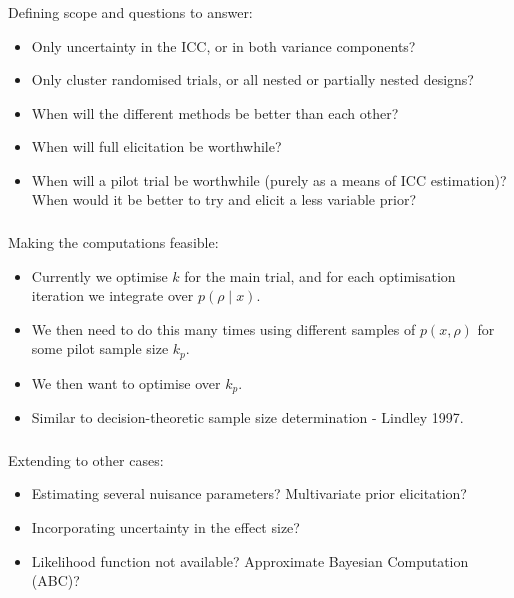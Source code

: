 \documentclass{beamer}
\begin{document}
\begin{frame}
\frametitle{}
Defining scope and questions to answer:
\begin{itemize}
\item Only uncertainty in the ICC, or in both variance components?
\item Only cluster randomised trials, or all nested or partially nested designs?
\item When will the different methods be better than each other?
\item When will full elicitation be worthwhile?
\item When will a pilot trial be worthwhile (purely as a means of ICC estimation)? When would it be better to try and elicit a less variable prior?
\end{itemize}
\end{frame}

\begin{frame}
\frametitle{}
Making the computations feasible:
\begin{itemize}
\item Currently we optimise $k$ for the main trial, and for each optimisation iteration we integrate over $p(\rho \mid x)$.
\item We then need to do this many times using different samples of $p(x, \rho)$ for some pilot sample size $k_{p}$.
\item We then want to optimise over $k_{p}$.
\item Similar to decision-theoretic sample size determination - Lindley 1997.
\end{itemize}
\end{frame}

\begin{frame}
\frametitle{}
Extending to other cases:
\begin{itemize}
\item Estimating several nuisance parameters? Multivariate prior elicitation?
\item Incorporating uncertainty in the effect size?
\item Likelihood function not available? Approximate Bayesian Computation (ABC)?
\end{itemize}
\end{frame}
\end{document}

